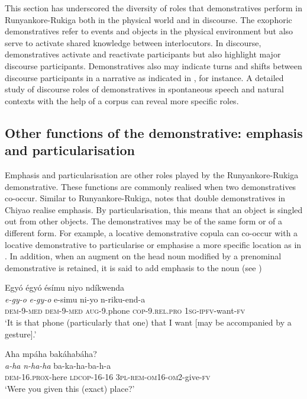 \documentclass[output=paper 		  ]{langscibook}
\begin{document}
This section has underscored the diversity of roles that demonstratives perform in Run\-yan\-ko\-re-Ru\-ki\-ga both in the physical world and in discourse. The exophoric demonstratives refer to events and objects in the physical environment but also serve to activate shared knowledge between interlocutors. In discourse, demonstratives activate and reactivate participants but also highlight major discourse participants. Demonstratives also may indicate turns and shifts between discourse participants in a narrative as indicated in , for instance. A detailed study of discourse roles of demonstratives in spontaneous speech and natural contexts with the help of a corpus can reveal more specific roles.

\subsection{Other functions of the demonstrative: emphasis and particularisation}\label{sec:asiimwe:4.3}

Emphasis and particularisation are other roles played by the Run\-yan\-ko\-re-Ru\-ki\-ga demonstrative. These functions are commonly realised when two demonstratives co-occur. Similar to Run\-yan\-ko\-re-Ru\-ki\-ga,  notes that double demonstratives in Chiyao realise emphasis. By particularisation, this means that an object is singled out from other objects. The demonstratives may be of the same form  or of a different form. For example, a locative demonstrative copula can co-occur with a locative demonstrative to particularise or emphasise a more specific location as in . In addition, when an augment on the head noun modified by a prenominal demonstrative is retained, it is said to add emphasis to the noun (see )

\ea%
    \label{ex:asiimwe:55}
    Egyó égyó  ésímu niyo ndíkwenda\\
\gll  \emph{e-gy-o}  \emph{e-gy-o}  e-simu  ni-yo  n-riku-end-a\\
  \textsc{dem}{}-9-\textsc{med}  \textsc{dem-}9-\textsc{med}  \textsc{aug}{}-9.phone  \textsc{cop-9.rel.pro}  \textsc{1sg-ipfv}{}-want-\textsc{fv}\\
\glt ‘It is that phone (particularly that one) that I want [may be accompanied by a gesture].’

\ex%
    \label{ex:asiimwe:56}
    Aha mpáha bakáhabáha?\\
\gll  \emph{a-ha}  \emph{n-ha-ha}  ba-ka-ha-ba-h-a\\
  \textsc{dem-16.prox}{}-here  \textsc{ldcop}{}-16-16  \textsc{3pl-rem}{}-\textsc{om16-om2}-give-\textsc{fv} \\
\glt ‘Were you given this (exact) place?’
\z
\end{document}
